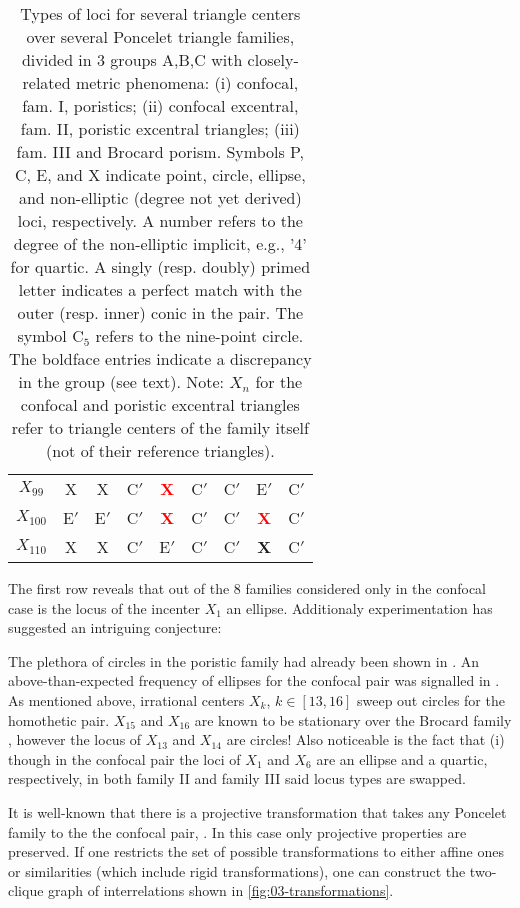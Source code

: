 \begin{table}
\begin{tabular}{|c||c|c|c||c|c|c||c|c||}
$X_{99}$ & X & X & C$'$ & \textcolor{red}{\textbf{X}}&C$'$ & C$'$ & E$'$ & C$'$ \\
$X_{100}$ & E$'$ & E$'$ & C$'$ & \textcolor{red}{\textbf{X}}&C$'$ & C$'$ & \textcolor{red}{\textbf{X}} & C$'$ \\
$X_{110}$ & X & X & C$'$ & E$'$&C$'$ & C$'$ & \textbf{X} & C$'$ \\
 \hline
\end{tabular}
\caption{Types of loci for several triangle centers over several Poncelet triangle families, divided in 3 groups A,B,C with closely-related metric phenomena: (i) confocal, fam. I, poristics; (ii) confocal excentral, fam. II, poristic excentral triangles; (iii) fam. III and Brocard porism. Symbols P, C, E, and X indicate point, circle, ellipse, and non-elliptic (degree not yet derived) loci, respectively. A number refers to the degree of the non-elliptic implicit, e.g., '4' for quartic. A singly (resp. doubly) primed letter indicates a perfect match with the outer (resp. inner) conic in the pair. The symbol C$_5$ refers to the nine-point circle. The boldface entries indicate a discrepancy in the group (see text). Note: $X_n$ for the confocal and poristic excentral triangles refer to triangle centers of the family itself (not of their reference triangles).}
\label{tab:04-xn-comparison}
\end{table}

The first row reveals that out of the 8 families considered only in the confocal case is the locus of the incenter $X_1$ an ellipse. Additionaly experimentation has suggested an intriguing conjecture:

The plethora of circles in the poristic family had already been shown in \cite{odehnal2011-poristic}. An above-than-expected frequency of ellipses for the confocal pair was signalled in \cite{garcia2020-ellipses}. As mentioned above, irrational centers $X_k$, $k\in[13,16]$ sweep out circles for the homothetic pair. $X_{15}$ and $X_{16}$ are known to be stationary over the Brocard family \cite{bradley2007-brocard}, however the locus of $X_{13}$ and $X_{14}$ are circles! Also noticeable is the fact that (i) though in the confocal pair the loci of $X_1$ and $X_6$ are an ellipse and a quartic, respectively, in both family II and family III said locus types are swapped.

It is well-known that there is a projective transformation that takes any Poncelet family to the the confocal pair,  \cite{dragovic11}. In this case only  projective properties are preserved. 
If one restricts the set of possible transformations to either affine ones or similarities (which include rigid transformations), one can construct the two-clique graph of interrelations shown in \cref{fig:03-transformations}.

